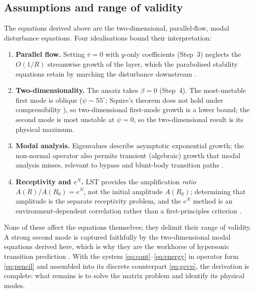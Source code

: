 \documentclass[11pt]{article}
\begin{document}
\subsection{Assumptions and range of validity}\label{sec:scope}
The equations derived above are the two-dimensional, parallel-flow, modal disturbance equations. Four
idealisations bound their interpretation:
\begin{enumerate}[nosep,leftmargin=1.9em]
  \item \textbf{Parallel flow.} Setting $\bar v=0$ with $y$-only coefficients (Step~3) neglects the
        $O(1/R)$ streamwise growth of the layer, which the parabolised stability equations retain by
        marching the disturbance downstream \cite{herbert1997}.
  \item \textbf{Two-dimensionality.} The ansatz takes $\beta=0$ (Step~4). The most-unstable first mode
        is oblique ($\psi\sim55^\circ$; Squire's theorem does not hold under compressibility
        \cite{mack1984}), so two-dimensional first-mode growth is a lower bound; the second mode is
        most unstable at $\psi=0$, so the two-dimensional result is its physical maximum.
  \item \textbf{Modal analysis.} Eigenvalues describe asymptotic exponential growth; the non-normal
        operator also permits transient (algebraic) growth that modal analysis misses, relevant to
        bypass and blunt-body transition paths \cite{schmid2001}.
  \item \textbf{Receptivity and $e^N$.} LST provides the amplification \emph{ratio}
        $A(R)/A(R_0)=e^N$, not the initial amplitude $A(R_0)$; determining that amplitude is the
        separate receptivity problem, and the $e^N$ method is an environment-dependent correlation
        rather than a first-principles criterion \cite{vaningen1956,fedorov2011}.
\end{enumerate}
None of these affect the equations themselves; they delimit their range of validity. A strong second
mode is captured faithfully by the two-dimensional modal equations derived here, which is why they are
the workhorse of hypersonic transition prediction \cite{mack1984,fedorov2011}. With the system
\eqref{eq:cont}--\eqref{eq:energy} in operator form \eqref{eq:pencil} and assembled into its
discrete counterpart \eqref{eq:gevp}, the derivation is complete: what remains is to solve the matrix
problem and identify its physical modes.
\end{document}

